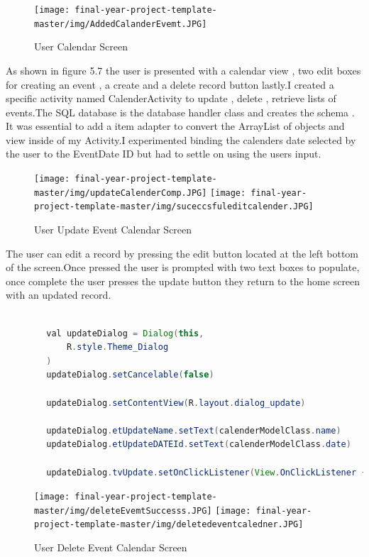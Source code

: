 \begin{figure}[H]
  \centering
    \texttt{[image: final-year-project-template-master/img/AddedCalanderEvemt.JPG]}
     \caption{User Calendar Screen}
\end{figure}


As shown in figure 5.7 the user is presented with  a calendar view , two edit boxes for creating an event , a create and a delete record button lastly.I created a specific activity named  CalenderActivity to update , delete , retrieve lists of events.The SQL database is the database handler class and creates the schema . It was essential to add a item adapter to convert the ArrayList of objects and view inside of my Activity.I experimented binding the calenders date selected by the user to the EventDate ID but had to settle on using the users input.






 \begin{figure}[H]
  \centering
    \texttt{[image: final-year-project-template-master/img/updateCalenderComp.JPG]}
        \texttt{[image: final-year-project-template-master/img/suceccsfuleditcalender.JPG]}

     \caption{User  Update Event Calendar Screen}
\end{figure}

The user can edit a record by pressing the edit button located at the left bottom of the screen.Once pressed the user is prompted with two text boxes to populate, once complete the user presses the update button they return to the home screen with an updated record.


\begin{lstlisting}[language=Java, caption=Update Calendar Event  ]

        val updateDialog = Dialog(this,
            R.style.Theme_Dialog
        )
        updateDialog.setCancelable(false)

        updateDialog.setContentView(R.layout.dialog_update)

        updateDialog.etUpdateName.setText(calenderModelClass.name)
        updateDialog.etUpdateDATEId.setText(calenderModelClass.date)

        updateDialog.tvUpdate.setOnClickListener(View.OnClickListener {

\end{lstlisting}



 \begin{figure}[H]
  \centering
  \texttt{[image: final-year-project-template-master/img/deleteEvemtSuccesss.JPG]}
    \texttt{[image: final-year-project-template-master/img/deletedeventcaledner.JPG]}

     \caption{User  Delete  Event Calendar Screen}
\end{figure}

